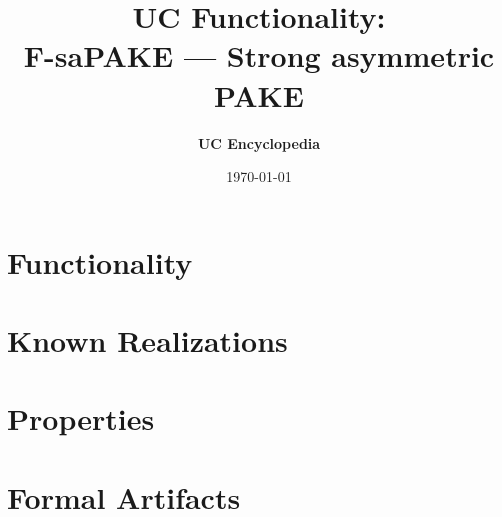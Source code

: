 \documentclass[11pt,a4paper]{article}
\title{\textbf{\Large UC Functionality:}\\[0.2em] \Large F-saPAKE --- Strong asymmetric PAKE}
\author{\textbf{UC Encyclopedia}}
\date{\today}
\newtheorem{functionality}{Functionality}
\begin{document}
\maketitle

\begin{abstract}
\end{abstract}

\section{Functionality}

%

\section{Known Realizations}


\section{Properties}


\section{Formal Artifacts}

\end{document}
